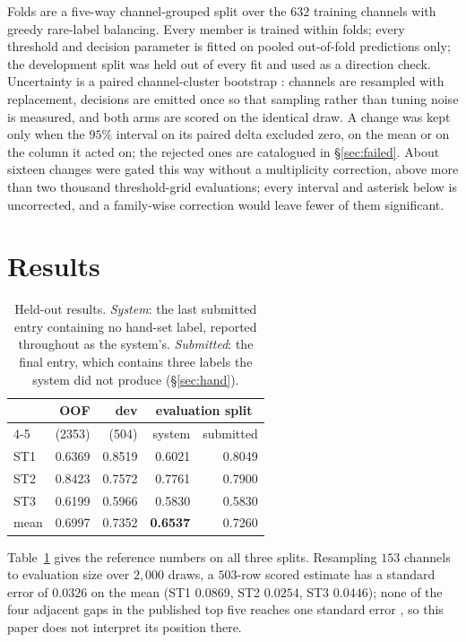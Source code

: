 \documentclass[11pt]{article}
\begin{document}
Folds are a five-way channel-grouped split over the $632$ training channels with greedy
rare-label balancing. Every member is trained within folds; every threshold and decision
parameter is fitted on pooled out-of-fold predictions only; the development split was held out
of every fit and used as a direction check. Uncertainty is a paired channel-cluster bootstrap
\cite{efron1979bootstrap}: channels are resampled with replacement, decisions are emitted once
so that sampling rather than tuning noise is measured, and both arms are scored on the identical
draw. A change was kept only when the $95\%$ interval on its paired delta excluded zero, on the
mean or on the column it acted on; the rejected ones are catalogued in \S\ref{sec:failed}.
About sixteen changes were gated this way without a multiplicity correction, above more than
two thousand threshold-grid evaluations; every interval and asterisk below is uncorrected, and
a family-wise correction would leave fewer of them significant.

\section{Results}
\label{sec:results}

\begin{table}[t]
\centering\small
\setlength{\tabcolsep}{4pt}
\begin{tabular}{@{}lrrrr@{}}
\toprule
& OOF & dev & \multicolumn{2}{c}{evaluation split} \\
\cmidrule(l){4-5}
& (2353) & (504) & system & submitted \\
\midrule
ST1  & 0.6369 & 0.8519 & 0.6021 & 0.8049 \\
ST2  & 0.8423 & 0.7572 & 0.7761 & 0.7900 \\
ST3  & 0.6199 & 0.5966 & 0.5830 & 0.5830 \\
\midrule
mean & 0.6997 & 0.7352 & \textbf{0.6537} & 0.7260 \\
\bottomrule
\end{tabular}
\caption{Held-out results. \emph{System}: the last submitted entry containing no hand-set
label, reported throughout as the system's. \emph{Submitted}: the final entry, which contains
three labels the system did not produce (\S\ref{sec:hand}).}
\label{tab:results}
\end{table}

Table~\ref{tab:results} gives the reference numbers on all three splits. Resampling $153$
channels to evaluation size over $2{,}000$ draws, a $503$-row scored estimate has a standard
error of $0.0326$ on the mean (ST1 $0.0869$, ST2 $0.0254$, ST3 $0.0446$); none of the four
adjacent gaps in the published top five reaches one standard error
\cite{card2020power,dror2018hitchhiker}, so this paper does not interpret its position there.
\end{document}
